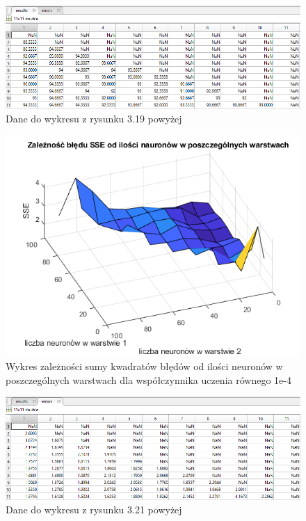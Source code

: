 \documentclass[a4paper, 12pt]{article}
\begin{document}
\begin{figure}[ht]
	\centering
	\includegraphics[width=12cm]{images/lr4 pk dane}
	\caption{Dane do wykresu z rysunku 3.19 powyżej}
\label{Fig:lr1 pk dane}
\end{figure}

\clearpage

\begin{figure}[ht]
	\centering
	\includegraphics[width=12cm]{images/lr4 sse}
	\caption{Wykres zależności sumy kwadratów błędów od ilości neuronów w poszczególnych warstwach dla współczynnika uczenia równego 1e-4}
\label{Fig:lr1 sse}
\end{figure}

\begin{figure}[ht]
	\centering
	\includegraphics[width=12cm]{images/lr4 sse dane}
	\caption{Dane do wykresu z rysunku 3.21 powyżej}
\label{Fig:lr1 sse dane}
\end{figure}
\end{document}
